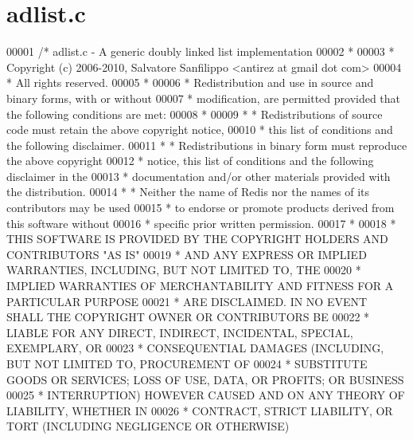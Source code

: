 \hypertarget{adlist_8c_source}{}\section{adlist.\+c}
\label{adlist_8c_source}

\begin{DoxyCode}
00001 \textcolor{comment}{/* adlist.c - A generic doubly linked list implementation}
00002 \textcolor{comment}{ *}
00003 \textcolor{comment}{ * Copyright (c) 2006-2010, Salvatore Sanfilippo <antirez at gmail dot com>}
00004 \textcolor{comment}{ * All rights reserved.}
00005 \textcolor{comment}{ *}
00006 \textcolor{comment}{ * Redistribution and use in source and binary forms, with or without}
00007 \textcolor{comment}{ * modification, are permitted provided that the following conditions are met:}
00008 \textcolor{comment}{ *}
00009 \textcolor{comment}{ *   * Redistributions of source code must retain the above copyright notice,}
00010 \textcolor{comment}{ *     this list of conditions and the following disclaimer.}
00011 \textcolor{comment}{ *   * Redistributions in binary form must reproduce the above copyright}
00012 \textcolor{comment}{ *     notice, this list of conditions and the following disclaimer in the}
00013 \textcolor{comment}{ *     documentation and/or other materials provided with the distribution.}
00014 \textcolor{comment}{ *   * Neither the name of Redis nor the names of its contributors may be used}
00015 \textcolor{comment}{ *     to endorse or promote products derived from this software without}
00016 \textcolor{comment}{ *     specific prior written permission.}
00017 \textcolor{comment}{ *}
00018 \textcolor{comment}{ * THIS SOFTWARE IS PROVIDED BY THE COPYRIGHT HOLDERS AND CONTRIBUTORS "AS IS"}
00019 \textcolor{comment}{ * AND ANY EXPRESS OR IMPLIED WARRANTIES, INCLUDING, BUT NOT LIMITED TO, THE}
00020 \textcolor{comment}{ * IMPLIED WARRANTIES OF MERCHANTABILITY AND FITNESS FOR A PARTICULAR PURPOSE}
00021 \textcolor{comment}{ * ARE DISCLAIMED. IN NO EVENT SHALL THE COPYRIGHT OWNER OR CONTRIBUTORS BE}
00022 \textcolor{comment}{ * LIABLE FOR ANY DIRECT, INDIRECT, INCIDENTAL, SPECIAL, EXEMPLARY, OR}
00023 \textcolor{comment}{ * CONSEQUENTIAL DAMAGES (INCLUDING, BUT NOT LIMITED TO, PROCUREMENT OF}
00024 \textcolor{comment}{ * SUBSTITUTE GOODS OR SERVICES; LOSS OF USE, DATA, OR PROFITS; OR BUSINESS}
00025 \textcolor{comment}{ * INTERRUPTION) HOWEVER CAUSED AND ON ANY THEORY OF LIABILITY, WHETHER IN}
00026 \textcolor{comment}{ * CONTRACT, STRICT LIABILITY, OR TORT (INCLUDING NEGLIGENCE OR OTHERWISE)}

\end{DoxyCode}
